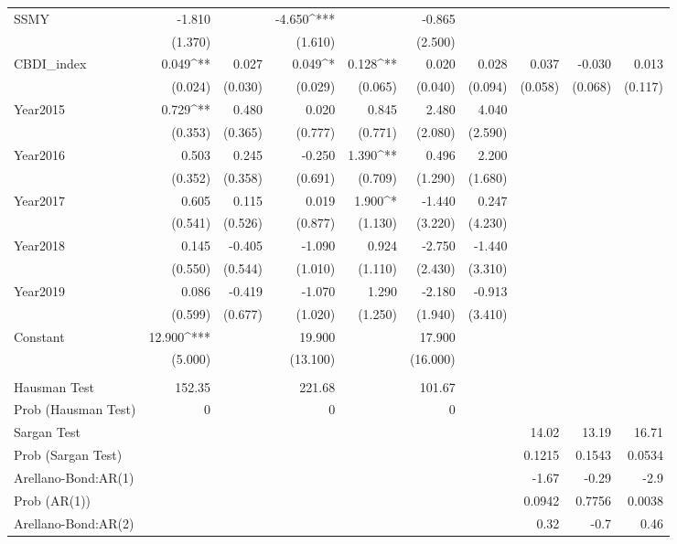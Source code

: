 \begin{table}[!htbp]
\begin{tabular}{@{\extracolsep{10pt}}lD{.}{.}{-3} D{.}{.}{-3} D{.}{.}{-3} D{.}{.}{-3} D{.}{.}{-3} D{.}{.}{-3} D{.}{.}{-3} D{.}{.}{-3} D{.}{.}{-3} }
  SSMY & -1.810 &  & -4.650^{***} &  & -0.865 &  &  &  &  \\ 
  & (1.370) &  & (1.610) &  & (2.500) &  &  &  &  \\ 
  CBDI\_index & 0.049^{**} & 0.027 & 0.049^{*} & 0.128^{**} & 0.020 & 0.028 & 0.037 & -0.030 & 0.013 \\ 
  & (0.024) & (0.030) & (0.029) & (0.065) & (0.040) & (0.094) & (0.058) & (0.068) & (0.117) \\ 
  Year2015 & 0.729^{**} & 0.480 & 0.020 & 0.845 & 2.480 & 4.040 &  &  &  \\ 
  & (0.353) & (0.365) & (0.777) & (0.771) & (2.080) & (2.590) &  &  &  \\ 
  Year2016 & 0.503 & 0.245 & -0.250 & 1.390^{**} & 0.496 & 2.200 &  &  &  \\ 
  & (0.352) & (0.358) & (0.691) & (0.709) & (1.290) & (1.680) &  &  &  \\ 
  Year2017 & 0.605 & 0.115 & 0.019 & 1.900^{*} & -1.440 & 0.247 &  &  &  \\ 
  & (0.541) & (0.526) & (0.877) & (1.130) & (3.220) & (4.230) &  &  &  \\ 
  Year2018 & 0.145 & -0.405 & -1.090 & 0.924 & -2.750 & -1.440 &  &  &  \\ 
  & (0.550) & (0.544) & (1.010) & (1.110) & (2.430) & (3.310) &  &  &  \\ 
  Year2019 & 0.086 & -0.419 & -1.070 & 1.290 & -2.180 & -0.913 &  &  &  \\ 
  & (0.599) & (0.677) & (1.020) & (1.250) & (1.940) & (3.410) &  &  &  \\ 
  Constant & 12.900^{***} &  & 19.900 &  & 17.900 &  &  &  &  \\ 
  & (5.000) &  & (13.100) &  & (16.000) &  &  &  &  \\ 
 \hline \\[-1.8ex] 
Hausman Test & 152.35 &  & 221.68 &  & 101.67 &  &  &  &  \\ 
Prob (Hausman Test) & 0 &  & 0 &  & 0 &  &  &  &  \\ 
Sargan Test &  &  &  &  &  &  & 14.02 & 13.19 & 16.71 \\ 
Prob (Sargan Test) &  &  &  &  &  &  & 0.1215 & 0.1543 & 0.0534 \\ 
Arellano-Bond:AR(1) &  &  &  &  &  &  & -1.67 & -0.29 & -2.9 \\ 
Prob (AR(1)) &  &  &  &  &  &  & 0.0942 & 0.7756 & 0.0038 \\ 
Arellano-Bond:AR(2) &  &  &  &  &  &  & 0.32 & -0.7 & 0.46 \\ 

\end{tabular}
\end{table}
